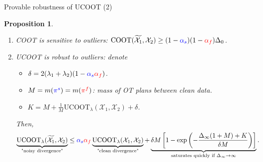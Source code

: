 \documentclass{beamer}
\newcommand{\coot}{\text{COOT}}
\newcommand{\ucoot}{\text{UCOOT}}
\newcommand{\cX}{\mathcal X}
\newcommand{\pis}{{\color{blue}{\pi^s}}}
\newcommand{\pif}{{\color{red}{\pi^f}}}
\newtheorem{proposition}{Proposition}[section]
\begin{document}
\begin{frame}{Provable robustness of UCOOT (2)}
\scriptsize
\vspace{-0.2cm}
\begin{proposition}
  \begin{enumerate}
    \setlength\itemindent{5pt}
    \item[1.] COOT is sensitive to outliers:
    $\coot(\widetilde{\cX_1}, \cX_2) \geq (1 - {\color{blue}{\alpha_s}})(1 - {\color{red}{\alpha_f}})\Delta_0$.

    \item[2.] UCOOT is robust to outliers: denote
    \begin{itemize}
      \scriptsize
      \setlength\itemindent{10pt}
      \item[$\bullet$] $\delta = 2(\lambda_1 + \lambda_2)(1 - {\color{blue}{\alpha_s}} {\color{red}{\alpha_f}})$.

      \item[$\bullet$] $M= m(\pis) = m(\pif)$: mass of OT plans between clean data.

      \item[$\bullet$] $K = M + \frac{1}{M}\ucoot_{\lambda}(\cX_1, \cX_2) + \delta$.
    \end{itemize}
    Then,
    \vspace{-0.4cm}
    \begin{equation*} %
    \begin{split}
      \underbrace{\ucoot_{\lambda}(\widetilde{\cX_1}, \cX_2)}_{\text{"noisy divergence"}}
      &\leq {\color{blue}{\alpha_s}} {\color{red}{\alpha_f}}
      \underbrace{\ucoot_{\lambda}(\cX_1, \cX_2)}_{\text{"clean divergence"}}
      + \underbrace{\delta M \left[ 1 -
      \exp \left( {- \frac{\Delta_{\infty}(1+M) + K}{\delta M}} \right) \right]}_{\text{saturates quickly if } \Delta_{\infty} \to \infty}.
    \end{split}
    \end{equation*}
  \end{enumerate}


\end{proposition}
\end{frame}
\end{document}
